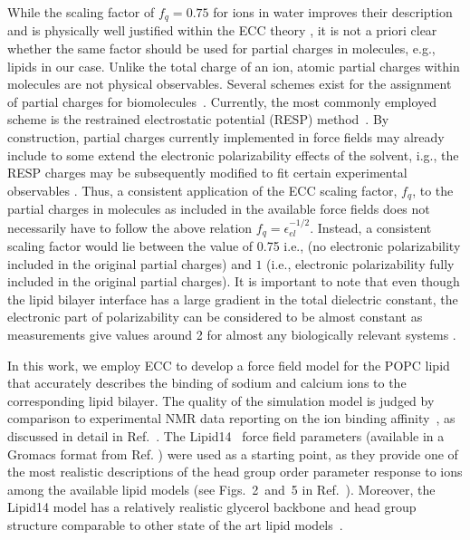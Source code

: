 \documentclass[aip,jcp,twocolumn]{revtex4}
\begin{document}
While the scaling factor of $f_q = 0.75$ for ions in water improves their description and is physically well justified within the ECC theory \cite{Leontyev2011},
it is not a priori  clear whether the same factor should be used for partial charges in molecules,
e.g., lipids in our case. Unlike the total charge of an ion, atomic partial charges within molecules are not physical observables.
Several schemes exist for the assignment of partial charges for biomolecules~\cite{Hu2007}.
Currently, the most commonly employed scheme is the restrained electrostatic potential (RESP) method~\cite{RESP_paper,Singh1984}.
By construction, partial charges currently implemented in force fields may already 
include  to some extend the electronic polarizability effects of the solvent, i.g.,
the RESP charges may be subsequently modified to fit certain experimental observables . 
Thus, a consistent application of the ECC scaling factor, $f_q$, to the partial charges in molecules as
included in the available force fields does not necessarily have to follow the above relation $f_q = \epsilon _{el} ^{-1/2}$. 
Instead, a consistent scaling factor would lie between the value of 0.75 i.e., (no electronic polarizability included in the original partial charges)
and $1$ (i.e., electronic polarizability fully included in the original partial charges).
It is important to note that even though the lipid bilayer interface has a large gradient in
the total dielectric constant, the electronic part of polarizability can be considered to be almost constant
as measurements give values around 2 
for almost any biologically relevant systems \cite{some_original_work, leontyev11}.


In this work, we employ ECC to develop a force field model for
the POPC lipid that accurately describes the binding of sodium and calcium ions to the corresponding lipid bilayer.
The quality of the simulation model is judged by comparison 
to experimental NMR data reporting on the ion binding
affinity~\cite{akutsu81,altenbach84,scherer89}, 
as discussed in detail in Ref.~.
The Lipid14~\cite{dickson14} force field parameters (available in a Gromacs format from Ref. )
were used as a starting point, as they provide one of the most
realistic descriptions of the head group order parameter response to ions 
among the available lipid models (see Figs.~2~and~5 in Ref.~).
Moreover, the Lipid14 model has a relatively realistic glycerol backbone and
head group structure comparable to other state of the art lipid models~\cite{botan15}.
\end{document}
